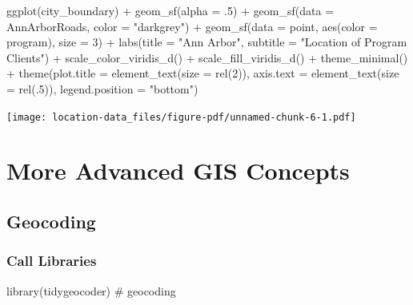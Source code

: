 \documentclass[
  letterpaper,
  DIV=11,
  numbers=noendperiod,
  oneside]{scrreprt}
\newenvironment{Shaded}{\begin{snugshade}}{\end{snugshade}}
\newcommand{\AttributeTok}[1]{\textcolor[rgb]{0.40,0.45,0.13}{#1}}
\newcommand{\CommentTok}[1]{\textcolor[rgb]{0.37,0.37,0.37}{#1}}
\newcommand{\DecValTok}[1]{\textcolor[rgb]{0.68,0.00,0.00}{#1}}
\newcommand{\FunctionTok}[1]{\textcolor[rgb]{0.28,0.35,0.67}{#1}}
\newcommand{\NormalTok}[1]{\textcolor[rgb]{0.00,0.23,0.31}{#1}}
\newcommand{\SpecialCharTok}[1]{\textcolor[rgb]{0.37,0.37,0.37}{#1}}
\newcommand{\StringTok}[1]{\textcolor[rgb]{0.13,0.47,0.30}{#1}}
\begin{document}
\begin{Shaded}
\begin{Highlighting}[]
\FunctionTok{ggplot}\NormalTok{(city\_boundary) }\SpecialCharTok{+}
  \FunctionTok{geom\_sf}\NormalTok{(}\AttributeTok{alpha =}\NormalTok{ .}\DecValTok{5}\NormalTok{) }\SpecialCharTok{+}
  \FunctionTok{geom\_sf}\NormalTok{(}\AttributeTok{data =}\NormalTok{ AnnArborRoads, }
          \AttributeTok{color =} \StringTok{"darkgrey"}\NormalTok{) }\SpecialCharTok{+}
  \FunctionTok{geom\_sf}\NormalTok{(}\AttributeTok{data =}\NormalTok{ point,}
          \FunctionTok{aes}\NormalTok{(}\AttributeTok{color =}\NormalTok{ program),}
          \AttributeTok{size =} \DecValTok{3}\NormalTok{) }\SpecialCharTok{+}
\FunctionTok{labs}\NormalTok{(}\AttributeTok{title =} \StringTok{"Ann Arbor"}\NormalTok{,}
     \AttributeTok{subtitle =} \StringTok{"Location of Program Clients"}\NormalTok{) }\SpecialCharTok{+}
  \FunctionTok{scale\_color\_viridis\_d}\NormalTok{() }\SpecialCharTok{+}
  \FunctionTok{scale\_fill\_viridis\_d}\NormalTok{() }\SpecialCharTok{+}
  \FunctionTok{theme\_minimal}\NormalTok{() }\SpecialCharTok{+}
  \FunctionTok{theme}\NormalTok{(}\AttributeTok{plot.title =} \FunctionTok{element\_text}\NormalTok{(}\AttributeTok{size =} \FunctionTok{rel}\NormalTok{(}\DecValTok{2}\NormalTok{)), }
        \AttributeTok{axis.text =} \FunctionTok{element\_text}\NormalTok{(}\AttributeTok{size =} \FunctionTok{rel}\NormalTok{(.}\DecValTok{5}\NormalTok{)),}
        \AttributeTok{legend.position =} \StringTok{"bottom"}\NormalTok{) }
\end{Highlighting}
\end{Shaded}

\texttt{[image: location-data\_files/figure-pdf/unnamed-chunk-6-1.pdf]}

\part{More Advanced GIS Concepts}

\chapter{Geocoding}\label{sec-geocoding}

\section{Call Libraries}\label{call-libraries-6}

\begin{Shaded}
\begin{Highlighting}[]
\FunctionTok{library}\NormalTok{(tidygeocoder) }\CommentTok{\# geocoding}
\end{Highlighting}
\end{Shaded}
\end{document}
